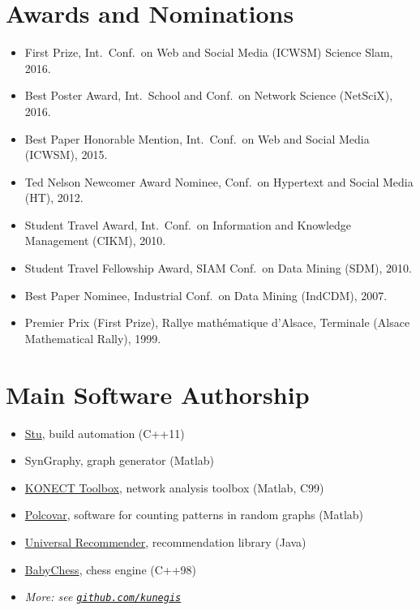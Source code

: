\documentclass[line,margin]{res}
\begin{document}
\begin{resume}
\section{Awards and Nominations}
\begin{itemize}
  \item First Prize, Int.\ Conf.\ on Web and Social Media (ICWSM) Science Slam, 2016.
  \item Best Poster Award, Int.\ School and Conf.\ on Network Science
    (NetSciX), 2016. 
  \item Best Paper Honorable Mention, Int.\ Conf.\ on Web and Social
    Media (ICWSM), 2015.  
  \item Ted Nelson Newcomer Award Nominee, Conf.\ on Hypertext and
    Social Media (HT), 2012.   
  \item Student Travel Award, Int.\ Conf.\ on Information and Knowledge
    Management (CIKM), 2010. 
  \item Student Travel Fellowship Award, SIAM Conf.\ on Data Mining (SDM),
    2010.  
  \item Best Paper Nominee, Industrial Conf.\ on Data Mining (IndCDM), 2007.    
  \item Premier Prix (First Prize), Rallye mathématique d'Alsace, Terminale (Alsace Mathematical Rally), 1999. 
\end{itemize}

\section{Main Software Authorship}
\begin{itemize}
  \item \href{https://github.com/kunegis/stu}{Stu}, build automation (C++11)
  \item SynGraphy, graph generator (Matlab)
  \item \href{https://github.com/kunegis/konect-toolbox}{KONECT Toolbox}, network analysis toolbox (Matlab, C99)
  \item \href{https://west.uni-koblenz.de/Research/systems/polcovar}{Polcovar}, software for counting patterns in random graphs (Matlab)
  \item \href{https://github.com/kunegis/universal-recommender}{Universal Recommender}, recommendation library (Java)
  \item \href{https://github.com/kunegis/babychess}{BabyChess}, chess engine (C++98)
  \item \emph{More:  see {\tt \href{https://github.com/kunegis}{github.com/kunegis}}}
\end{itemize}


\end{resume}
\end{document}
